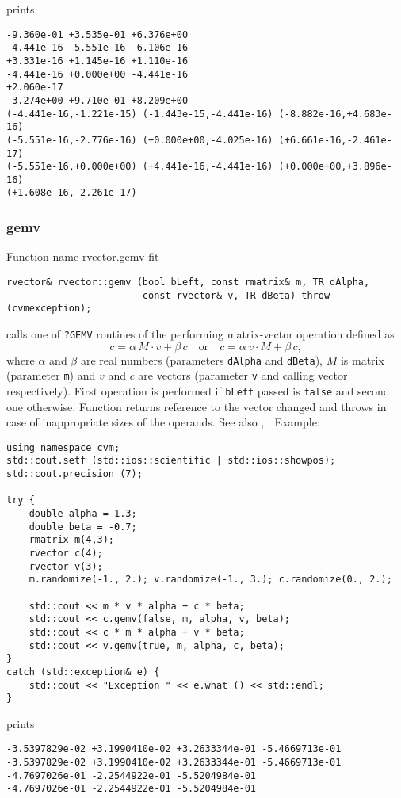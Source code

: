 prints
\begin{Verbatim}
-9.360e-01 +3.535e-01 +6.376e+00
-4.441e-16 -5.551e-16 -6.106e-16
+3.331e-16 +1.145e-16 +1.110e-16
-4.441e-16 +0.000e+00 -4.441e-16
+2.060e-17
-3.274e+00 +9.710e-01 +8.209e+00
(-4.441e-16,-1.221e-15) (-1.443e-15,-4.441e-16) (-8.882e-16,+4.683e-16)
(-5.551e-16,-2.776e-16) (+0.000e+00,-4.025e-16) (+6.661e-16,-2.461e-17)
(-5.551e-16,+0.000e+00) (+4.441e-16,-4.441e-16) (+0.000e+00,+3.896e-16)
(+1.608e-16,-2.261e-17)
\end{Verbatim}
\newpage


\subsubsection{gemv}
Function%
\pdfdest name {rvector.gemv} fit
\begin{verbatim}
rvector& rvector::gemv (bool bLeft, const rmatrix& m, TR dAlpha,
                        const rvector& v, TR dBeta) throw (cvmexception);
\end{verbatim}
calls one of \verb"?GEMV" routines of the
performing matrix-vector operation defined as
\begin{equation*}
c=\alpha\,M\cdot v + \beta\,c\quad\text{or}\quad c=\alpha\,v\cdot M + \beta\, c,
\end{equation*}
where $\alpha$ and $\beta$ are real numbers 
(parameters \verb"dAlpha" and \verb"dBeta"),
$M$ is  matrix (parameter \verb"m")
and $v$ and $c$ are vectors (parameter \verb"v"
and calling vector respectively).
First operation is performed if \verb"bLeft" passed
is \verb"false" and second one otherwise.
Function
returns  reference to the vector changed and throws
in case of inappropriate sizes of the operands.
See also
,
.
Example:
\begin{Verbatim}
using namespace cvm;
std::cout.setf (std::ios::scientific | std::ios::showpos);
std::cout.precision (7);

try {
    double alpha = 1.3;
    double beta = -0.7;
    rmatrix m(4,3);
    rvector c(4);
    rvector v(3);
    m.randomize(-1., 2.); v.randomize(-1., 3.); c.randomize(0., 2.);

    std::cout << m * v * alpha + c * beta;
    std::cout << c.gemv(false, m, alpha, v, beta);
    std::cout << c * m * alpha + v * beta;
    std::cout << v.gemv(true, m, alpha, c, beta);
}
catch (std::exception& e) {
    std::cout << "Exception " << e.what () << std::endl;
}
\end{Verbatim}
prints
\begin{Verbatim}
-3.5397829e-02 +3.1990410e-02 +3.2633344e-01 -5.4669713e-01
-3.5397829e-02 +3.1990410e-02 +3.2633344e-01 -5.4669713e-01
-4.7697026e-01 -2.2544922e-01 -5.5204984e-01
-4.7697026e-01 -2.2544922e-01 -5.5204984e-01
\end{Verbatim}
\newpage



